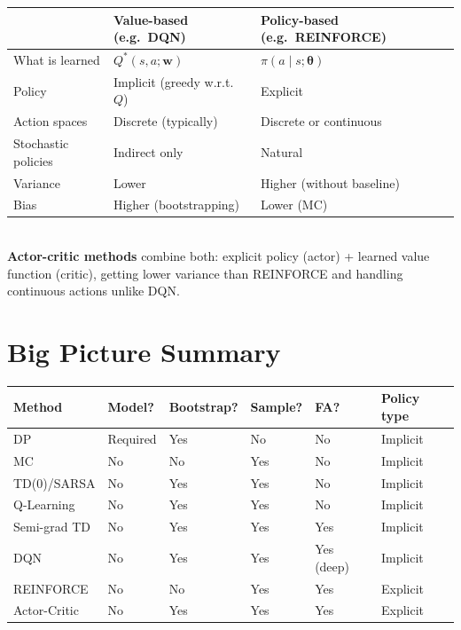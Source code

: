\documentclass[11pt,a4paper]{article}
\begin{document}
\begin{tcolorbox}[colback=LightBlue,colframe=AccentBlue,boxrule=0.8pt,arc=3pt]
\begin{tabular}{@{}lll@{}}
\toprule
 & \textbf{Value-based} (e.g.\ DQN) & \textbf{Policy-based} (e.g.\ REINFORCE) \\
\midrule
What is learned & $Q^*(s,a;\mathbf{w})$ & $\pi(a\mid s;\boldsymbol{\theta})$ \\
Policy & Implicit (greedy w.r.t.\ $Q$) & Explicit \\
Action spaces & Discrete (typically) & Discrete or continuous \\
Stochastic policies & Indirect only & Natural \\
Variance & Lower & Higher (without baseline) \\
Bias & Higher (bootstrapping) & Lower (MC) \\
\bottomrule
\end{tabular}\\[6pt]
\textbf{Actor-critic methods} combine both: explicit policy (actor) + learned value function (critic), getting lower variance than REINFORCE and handling continuous actions unlike DQN.
\end{tcolorbox}

\section{Big Picture Summary}

\begin{tcolorbox}[colback=AlgoPurpleBg,colframe=AlgoPurple,boxrule=1pt,arc=4pt,
  title={\bfseries\color{white} Complete RL Methods Overview},
  attach boxed title to top left={yshift=-2mm,xshift=4mm},
  boxed title style={colback=AlgoPurple,rounded corners,boxrule=0pt}]
\begin{tabular}{@{}llllll@{}}
\toprule
\textbf{Method} & \textbf{Model?} & \textbf{Bootstrap?} & \textbf{Sample?} & \textbf{FA?} & \textbf{Policy type} \\
\midrule
DP & Required & Yes & No & No & Implicit \\
MC & No & No & Yes & No & Implicit \\
TD(0)/SARSA & No & Yes & Yes & No & Implicit \\
Q-Learning & No & Yes & Yes & No & Implicit \\
Semi-grad TD & No & Yes & Yes & Yes & Implicit \\
DQN & No & Yes & Yes & Yes (deep) & Implicit \\
REINFORCE & No & No & Yes & Yes & Explicit \\
Actor-Critic & No & Yes & Yes & Yes & Explicit \\
\bottomrule
\end{tabular}
\end{tcolorbox}
\end{document}
